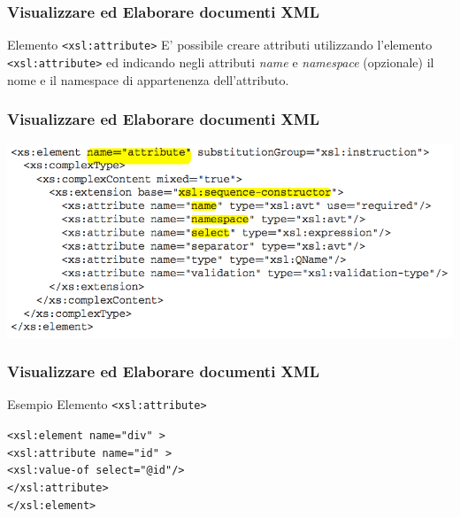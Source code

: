 
\begin{frame}
    \frametitle{Visualizzare ed Elaborare documenti XML}
    \addtocounter{nframe}{1}
    

     \begin{block}{Elemento \texttt{<xsl:attribute>}}
        E' possibile creare attributi utilizzando l’elemento \texttt{<xsl:attribute>} ed indicando negli attributi \textit{name} e \textit{namespace} (opzionale) il nome e il namespace di appartenenza dell’attributo.
     \end{block}

\end{frame}

\begin{frame}
    \frametitle{Visualizzare ed Elaborare documenti XML}
    \addtocounter{nframe}{1}
    
    \begin{center}
        \includegraphics[width=.95\textwidth]{imgs/Schema-attributo.png}
    \end{center}

\end{frame}


\begin{frame}
    \frametitle{Visualizzare ed Elaborare documenti XML}
    \addtocounter{nframe}{1}
    

     \begin{block}{Esempio Elemento \texttt{<xsl:attribute>}}
        
        \texttt{<xsl:element name="div" >}
        \\\texttt{<xsl:attribute name="id" >}
        \\\texttt{<xsl:value-of select="@id"/>}
        \\\texttt{</xsl:attribute>}
        \\\texttt{</xsl:element>}

     \end{block}
\end{frame}


